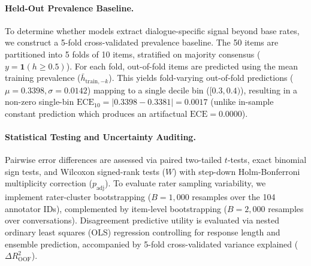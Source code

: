\paragraph{Held-Out Prevalence Baseline.}
To determine whether models extract dialogue-specific signal beyond base rates, we construct a 5-fold cross-validated prevalence baseline. The 50 items are partitioned into 5 folds of 10 items, stratified on majority consensus ($y = \mathbf{1}(h \ge 0.5)$). For each fold, out-of-fold items are predicted using the mean training prevalence ($\bar{h}_{\text{train}, -k}$). This yields fold-varying out-of-fold predictions ($\mu = 0.3398, \sigma = 0.0142$) mapping to a single decile bin ($[0.3, 0.4)$), resulting in a non-zero single-bin $\text{ECE}_{10} = |0.3398 - 0.3381| = 0.0017$ (unlike in-sample constant prediction which produces an artifactual $\text{ECE}=0.0000$).

\paragraph{Statistical Testing and Uncertainty Auditing.}
Pairwise error differences are assessed via paired two-tailed $t$-tests, exact binomial sign tests, and Wilcoxon signed-rank tests ($W$) with step-down Holm-Bonferroni multiplicity correction ($p_{\text{adj}}$). To evaluate rater sampling variability, we implement rater-cluster bootstrapping ($B=1,000$ resamples over the 104 annotator IDs), complemented by item-level bootstrapping ($B=2,000$ resamples over conversations). Disagreement predictive utility is evaluated via nested ordinary least squares (OLS) regression controlling for response length and ensemble prediction, accompanied by 5-fold cross-validated variance explained ($\Delta R^2_{\text{OOF}}$).
